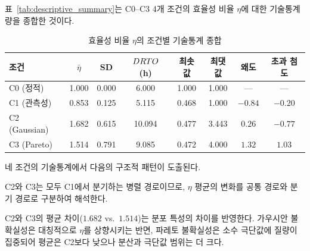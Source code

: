 

\section{}
\label{sec:descriptive_summary}

\p{[}표~\vref{tab:descriptive_summary}\p{]}는 C0--C3 4개 조건의 효율성 비율 $\eta$에
대한 기술통계량을 종합한 것이다.

\begin{table}[htbp]
  \centering
  \caption{효율성 비율 $\eta$의 조건별 기술통계 종합}
  \label{tab:descriptive_summary}
  \small
  \begin{tabular}{lccccccc}
    \toprule
    조건 & $\bar{\eta}$ & SD & $DRTO$ (h) & 최솟값 & 최댓값 & 왜도 & 초과 첨도 \\
    \midrule
    C0 (정적) & 1.000 & 0.000 & 6.000 & 1.000 & 1.000 & --- & --- \\
    C1 (관측성) & 0.853 & 0.125 & 5.115 & 0.468 & 1.000 & $-0.84$ & $-0.20$ \\
    C2 (Gaussian) & 1.682 & 0.615 & 10.094 & 0.477 & 3.443 & $0.26$ & $-0.77$ \\
    C3 (Pareto) & 1.514 & 0.791 & 9.085 & 0.472 & 4.000 & $1.32$ & $1.03$ \\
    \bottomrule
  \end{tabular}
\end{table}

네 조건의 기술통계에서 다음의 구조적 패턴이 도출된다.

 C2와 C3는 모두 C1에서 분기하는 병렬 경로이므로,
$\eta$ 평균의 변화를 공통 경로와 분기 경로로 구분하여 해석한다.

C2와 C3의 평균 차이($1.682$ vs.\ $1.514$)는 분포 특성의 차이를 반영한다.
가우시안 불확실성은 대칭적으로 $\eta$를 상향시키는 반면,
파레토 불확실성은 소수 극단값에 질량이 집중되어
평균은 C2보다 낮으나 분산과 극단값 범위는 더 크다.

